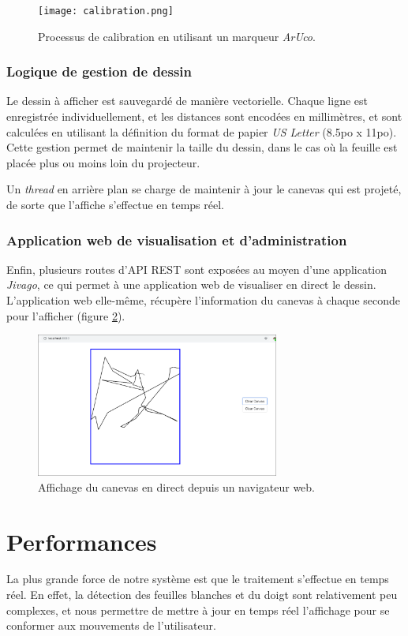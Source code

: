 \documentclass[11pt]{report}
\begin{document}
\begin{figure}[h]
  \centering
  \texttt{[image: calibration.png]}
  \caption{Processus de calibration en utilisant un marqueur \textit{ArUco}.}
  \label{calibration_aruco}
  \end{figure}

\subsection{Logique de gestion de dessin}

Le dessin à afficher est sauvegardé de manière vectorielle. Chaque ligne est
enregistrée individuellement, et les distances sont encodées en millimètres, et
sont calculées en utilisant la définition du format de papier \textit{US
  Letter} (8.5po x 11po). Cette gestion permet de maintenir la taille du dessin,
dans le cas où la feuille est placée plus ou moins loin du projecteur.

Un \textit{thread} en arrière plan se charge de maintenir à jour le canevas qui
est projeté, de sorte que l'affiche s'effectue en temps réel. 

\subsection{Application web de visualisation et d'administration}

Enfin, plusieurs routes d'API REST sont exposées au moyen d'une application
\textit{Jivago}, ce qui permet à une application web de visualiser en direct le
dessin. L'application web elle-même, récupère l'information du canevas à chaque
seconde pour l'afficher (figure \ref{web_ui}). 

\begin{figure}
  \centering
  \includegraphics[width=8cm]{web-canvas.png}
  \caption{Affichage du canevas en direct depuis un navigateur web.}
  \label{web_ui}
  \end{figure}

\chapter{Performances}
La plus grande force de notre système est que le traitement s'effectue en temps
réel. En effet, la détection des feuilles blanches et du doigt sont relativement
peu complexes, et nous permettre de mettre à jour en temps réel l'affichage pour
se conformer aux mouvements de l'utilisateur.
\end{document}
